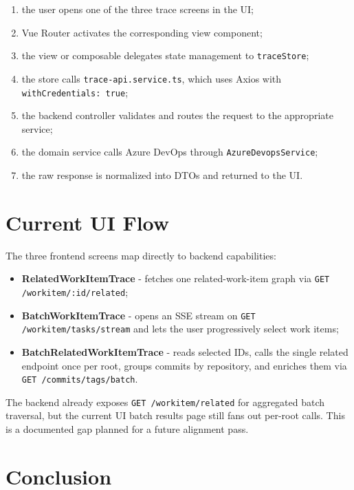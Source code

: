 \documentclass[12pt,a4paper]{report}
\newcommand{\code}[1]{\texttt{\small\color{codered}#1}}
\begin{document}
\begin{enumerate}
  \item the user opens one of the three trace screens in the UI;
  \item Vue Router activates the corresponding view component;
  \item the view or composable delegates state management to \code{traceStore};
  \item the store calls \code{trace-api.service.ts}, which uses Axios with \code{withCredentials: true};
  \item the backend controller validates and routes the request to the appropriate service;
  \item the domain service calls Azure DevOps through \code{AzureDevopsService};
  \item the raw response is normalized into DTOs and returned to the UI.
\end{enumerate}

\section{Current UI Flow}

The three frontend screens map directly to backend capabilities:

\begin{itemize}
  \item \textbf{RelatedWorkItemTrace} - fetches one related-work-item graph via \code{GET /workitem/:id/related};
  \item \textbf{BatchWorkItemTrace} - opens an SSE stream on \code{GET /workitem/tasks/stream} and lets the user progressively select work items;
  \item \textbf{BatchRelatedWorkItemTrace} - reads selected IDs, calls the single related endpoint once per root, groups commits by repository, and enriches them via \code{GET /commits/tags/batch}.
\end{itemize}

\begin{infobox}
The backend already exposes \code{GET /workitem/related} for aggregated batch traversal, but the current UI batch results page still fans out per-root calls. This is a documented gap planned for a future alignment pass.
\end{infobox}

\section{Conclusion}
\end{document}
